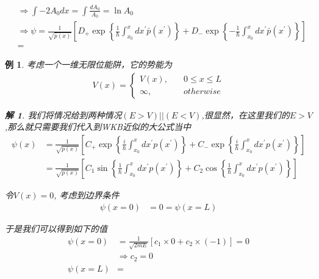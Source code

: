 \documentclass{article}
\newtheorem{example}{例}
\newtheorem{solution}{解}
\begin{document}
\begin{enumerate}
\begin{align*}
		            & \Rightarrow \int-2A_0 dx=\int \frac{dA_0}{A_0}=\ln A_0                                                                                                                                                                \\
		            & \Rightarrow \psi=\frac{1}{\sqrt{\bar{p}(x)}}\left[D_+\exp\left\{\frac{1}{\hbar}\int_{x_0}^{x}dx^\prime\bar{p}(x^\prime)\right\}+D_-\exp\left\{-\frac{1}{\hbar}\int_{x_0}^{x}dx^\prime\bar{p}(x^\prime)\right\}\right] \\
		            & =
	      \end{align*}
\end{enumerate}

\begin{example}
	考虑一个一维无限位能阱，它的势能为
	\begin{align*}
		V(x)=
		\begin{cases}
			V(x),   & \quad 0\leq x\leq L \\
			\infty, & \quad otherwise
		\end{cases}
	\end{align*}
	\begin{solution}
		我们将情况给到两种情况$(E>V)||(E<V)$,很显然，在这里我们的$E>V$,那么就只需要我们代入到WKB近似的大公式当中
		\begin{align*}
			\psi(x) & =\frac{1}{\sqrt{p(x)}}\left[C_+\exp\left\{\frac{i}{\hbar}\int_{x_0}^{x}dx^\prime p(x^\prime)\right\}+C_-\exp\left\{\frac{i}{\hbar}\int_{x_0}^{x}dx^\prime p(x^\prime)\right\}\right] \\
			        & =\frac{1}{\sqrt{p(x)}}\left[C_1\sin\left\{\frac{1}{\hbar}\int_{x_0}^{x}dx^\prime p(x^\prime)\right\}+C_2\cos\left\{\frac{1}{\hbar}\int_{x_0}^{x}dx^\prime p(x^\prime)\right\}\right]
		\end{align*}

		令$V(x)=0$,
		考虑到边界条件
		\begin{align*}
			\psi(x=0) & =0=\psi(x=L)
		\end{align*}

		于是我们可以得到如下的值
		\begin{align*}
			\psi(x=0) & =\frac{1}{\sqrt{2mE}}\left[c_1\times 0+c_2\times (-1)\right]=0 \\
			          & \Rightarrow c_2=0                                              \\
			\psi(x=L) & =
		\end{align*}
	\end{solution}
\end{example}
\end{document}
